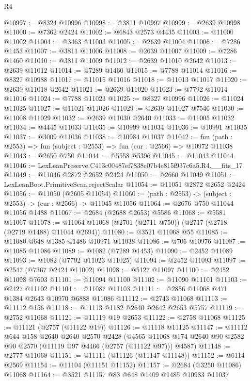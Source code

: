 \begin{lexlean}{R4}
\begin{coremodule}
@10997 := @8324 @10996
@10998 := @3811 @10997
@10999 := @2639 @10998
@11000 := @7362 @2424
@11002 := @6843 @2573 @4435
@11003 := @11000 @11002
@11004 := @3463 @11003
@11005 := @2639 @11004
@11006 := @7286 @1453
@11007 := @3811 @11006
@11008 := @2639 @11007
@11009 := @7286 @1460
@11010 := @3811 @11009
@11012 := @2639 @11010 @2642
@11013 := @2639 @11012
@11014 := @7289 @1460
@11015 := @7788 @11014
@11016 := @8327 @10988
@11017 := @11015 @11016
@11018 := @11013 @11017
@11020 := @2639 @11018 @2642
@11021 := @2639 @11020
@11023 := @7792 @11014 @11016
@11024 := @7788 @11023
@11025 := @8327 @10996
@11026 := @11024 @11025
@11027 := @11021 @11026
@11029 := @2639 @11027 @7546
@11030 := @11008 @11029
@11032 := @2639 @11030 @2640
@11033 := @11005 @11032
@11034 := @4445 @11033
@11035 := @10999 @11034
@11036 := @10991 @11035
@11037 := @3009 @11036
@11038 := @10984 @11037
@11042 := fun (path : @2553) => fun (subject : @2553) => fun (cur : @2566) => @10972 @11038
@11043 := @2650 @750
@11044 := @5558 @5396
@11045 := @11043 @11044
@11046 := LexLeanPreserve.C413c00487ef7838e07b4e815f937c6a5.R4.__fits_17
@11049 := @11046 @2872 @2652 @2424
@11050 := @2660 @11049
@11051 := LexLeanBoot.PrimitiveScan.rejectScalar
@11054 := @11051 @2872 @2652 @2424
@11056 := @11050 (@2605 @11054)
@11060 := (path : @2553) -> (subject : @2553) -> (cur : @2566) -> @11045 @11056
@11064 := @2676 @750 @11044 @11056 @1488
@11067 := @2684 (@2688 @2653) @5586
@11068 := @5581 @11067
@11078 := @11064 @11068 (@2701 (@2711 @750)) (@2717 (@2718 (@2719 @1488) @11044 @2694))
@11080 := @3521 @11068 @55
@11085 := @11080 @648 @1385 @1486 @10971 @11038
@11086 := @706 @10976
@11087 := @11085 @11086
@11089 := @1082 (@7289 @1453)
@11090 := @2452 @11089
@11093 := @1082 (@7792 @11023 @11025)
@11094 := @2452 @11093
@11097 := @2547 (@7367 @2424 @11002)
@11098 := @5127 @11097
@11100 := @2452 @11098 @7603
@11101 := @11094 @11100
@11102 := @11090 @11101
@11103 := @2427 @11102
@11104 := @11087 @11103
@11111 := @2856 @11068 @471 @1384 @2643 @10970 @6888 @11086
@11112 := @2743 @11068
@11113 := @11112 @156
@11118 := @11113 @1182 @2640 @2642 @2653 @5757
@11119 := @2752 @11068
@11121 := @11119 @19 @2653
@11122 := @2758 @11068
@11125 := @11121 (@2757 (@11122 @19))
@11126 := @11118 @11125
@11147 := @11112
    @644
    @158
    @2640
    @2640
    @2570
    @2428
    (@4565 @11068 @174 @2640 @90 @2582 @90 @2570 (@11119 @97 @4466 (@2757 (@11122 @97))) @4587)
@11148 := @2777 @11068
@11151 := @11111 (@11126 (@11147 @11148))
@11152 := @6114 @2569
@11154 := @11104 (@11151 @11152)
@11157 := @2684 (@3250 @11086) @11068
@11164 := @3521 @11157 @83 @648 @1409 @1485 @10983 @11037

\end{coremodule}
\end{lexlean}
